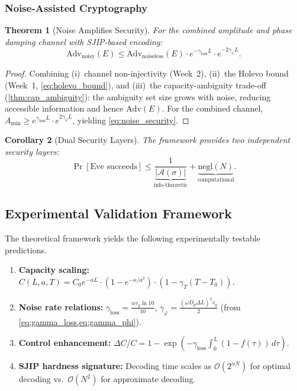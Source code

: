 \documentclass[journal,twocolumn]{IEEEtran}
\theoremstyle{definition}
\theoremstyle{plain}
\newtheorem{theorem}{Theorem}[section]
\newtheorem{corollary}[theorem]{Corollary}
\begin{document}
\subsubsection{Noise-Assisted Cryptography}

\begin{theorem}[Noise Amplifies Security]
For the combined amplitude and phase damping channel with SJIP-based
encoding:
\begin{equation}
  \mathrm{Adv}_{\mathrm{noisy}}(E)\le
  \mathrm{Adv}_{\mathrm{noiseless}}(E)\cdot
  e^{-\gamma_{\mathrm{loss}}L}\cdot e^{-2\gamma_\varphi L}.
  \label{eq:noise_security}
\end{equation}
\end{theorem}

\begin{proof}
Combining (i)~channel non-injectivity (Week~2), (ii)~the Holevo bound
(Week~1, \cref{eq:holevo_bound}), and (iii)~the capacity-ambiguity
trade-off (\cref{thm:cap_ambiguity}): the ambiguity set size grows with
noise, reducing accessible information and hence $\mathrm{Adv}(E)$. For
the combined channel,
$A_{\min}\ge e^{\gamma_{\mathrm{loss}}L}\cdot e^{2\gamma_\varphi L}$,
yielding \cref{eq:noise_security}.
\end{proof}

\begin{corollary}[Dual Security Layers]
The framework provides two independent security layers:
\begin{equation}
  \Pr[\text{Eve succeeds}]\le
  \underbrace{\frac{1}{|\mathcal{A}(\sigma)|}}_{\text{info-theoretic}}
  +\underbrace{\mathrm{negl}(N)}_{\text{computational}}.
  \label{eq:dual_security}
\end{equation}
\end{corollary}

\subsection{Experimental Validation Framework}

The theoretical framework yields the following experimentally testable
predictions.
\begin{enumerate}[leftmargin=*, label=(\arabic*), itemsep=2pt]
  \item \textbf{Capacity scaling:}
    $C(L,a,T)=C_0 e^{-\alpha L}\cdot(1-e^{-\kappa/a^2})
    \cdot(1-\gamma_T(T-T_0))$.
  \item \textbf{Noise rate relations:}
    $\gamma_{\mathrm{loss}}=\frac{\alpha v_g\ln10}{10}$,
    $\gamma_\varphi=\frac{(\omega D_p\Delta L)^2 v_g}{2}$
    (from \cref{eq:gamma_loss,eq:gamma_phi}).
  \item \textbf{Control enhancement:}
    $\Delta C/C=1-\exp(-\gamma_{\mathrm{loss}}
    \int_0^L(1-f(\tau))\,d\tau)$.
  \item \textbf{SJIP hardness signature:} Decoding time scales as
    $\mathcal{O}(2^{\alpha N})$ for optimal decoding
    vs.\ $\mathcal{O}(N^2)$ for approximate decoding.
\end{enumerate}
\end{document}
